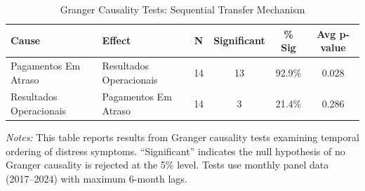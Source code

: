 \begin{table}[htbp]
\centering
\caption{Granger Causality Tests: Sequential Transfer Mechanism}
\label{tab:granger_causality}
\begin{tabular}{llcccc}
\hline
Cause & Effect & N & Significant & \% Sig & Avg p-value \\
\hline
Pagamentos Em Atraso & Resultados Operacionais & 14 & 13 & 92.9\% & 0.028 \\
Resultados Operacionais & Pagamentos Em Atraso & 14 & 3 & 21.4\% & 0.286 \\
\hline
\end{tabular}
\begin{tablenotes}
\small
\item \textit{Notes:} This table reports results from Granger causality tests examining temporal ordering of distress symptoms. ``Significant'' indicates the null hypothesis of no Granger causality is rejected at the 5\% level. Tests use monthly panel data (2017--2024) with maximum 6-month lags.
\end{tablenotes}
\end{table}